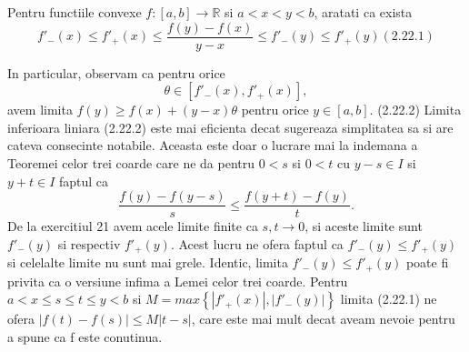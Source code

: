 \documentclass[a4paper,12pt,oneside]{report}
\begin{document}
Pentru functiile convexe \(f : \left [ a,b \right ]  \to \mathbb{R}\) si \(a< x<y< b\), aratati ca exista 
\begin{displaymath}
   {f}'_{-}\left ( x \right ) \leq  {f}'_{+}\left ( x \right ) \leq  \frac{f\left ( y \right ) - f\left ( x \right )}{y - x} \leq  {f}'_{-}\left ( y \right ) \leq  {f}'_{+}\left ( y \right )(2.22.1)
\end{displaymath}

In particular, observam ca pentru orice
\begin{displaymath}
   \theta \in \left [ {f}'_{-}\left ( x \right ), {f}'_{+}\left ( x \right ) \right ],
\end{displaymath}
 avem limita \(f\left ( y \right ) \geq  f\left ( x \right ) + \left ( y - x \right )\theta\) pentru orice \(y\in \left [ a,b \right ]\). (2.22.2)
Limita inferioara liniara (2.22.2) este mai eficienta decat sugereaza simplitatea sa si are cateva consecinte notabile. 
Aceasta este doar o lucrare mai la indemana a Teoremei celor trei coarde care ne da pentru \(0< s\) si \(0< t\) cu \(y - s \in I\) si \(y + t  \in I\) faptul ca 
\begin{displaymath}
   \frac{f\left ( y \right ) - f\left ( y - s \right )}{s}\leq \frac{f\left ( y + t \right ) - f\left ( y \right )}{t}.
\end{displaymath}
 De la exercitiul 21 avem acele limite finite ca \(s,t \to 0\), si aceste limite sunt \({f}'_{-}\left ( y \right )\) si respectiv \({f}'_{+}\left ( y \right )\). Acest lucru ne ofera faptul ca \({f}'_{-}\left ( y \right )\leq {f}'_{+}\left ( y \right )\) si celelalte limite nu sunt mai grele. Identic, limita \({f}'_{-}\left ( y \right )\leq {f}'_{+}\left ( y \right )\) poate fi privita ca o versiune infima a Lemei celor trei coarde. 
Pentru \(a < x \leq s\leq t\leq y<  b\) si \( M = max\left \{ \left | {f}'_{+} \left ( x \right )\right |,\left | {f}'_{-} \left ( y \right )\right |  \right \}\) limita (2.22.1) ne ofera \(\left | f\left ( t \right ) - f\left ( s \right ) \right |\leq M\left | t - s \right |\), care este mai mult decat aveam nevoie pentru a spune ca f este conutinua. 











\setlength{\baselineskip}{\normalbaselineskip}
\setlength{\parskip}{0pt}

\end{document}
